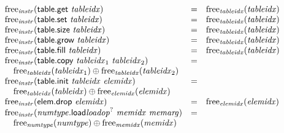 $$\begin{array}[t]{@{}lcl@{}l@{}}
{\mathrm{free}}_{\mathit{instr}}(\mathsf{table{.}get}~{\mathit{tableidx}}) & = & {\mathrm{free}}_{\mathit{tableidx}}({\mathit{tableidx}}) \\
{\mathrm{free}}_{\mathit{instr}}(\mathsf{table{.}set}~{\mathit{tableidx}}) & = & {\mathrm{free}}_{\mathit{tableidx}}({\mathit{tableidx}}) \\
{\mathrm{free}}_{\mathit{instr}}(\mathsf{table{.}size}~{\mathit{tableidx}}) & = & {\mathrm{free}}_{\mathit{tableidx}}({\mathit{tableidx}}) \\
{\mathrm{free}}_{\mathit{instr}}(\mathsf{table{.}grow}~{\mathit{tableidx}}) & = & {\mathrm{free}}_{\mathit{tableidx}}({\mathit{tableidx}}) \\
{\mathrm{free}}_{\mathit{instr}}(\mathsf{table{.}fill}~{\mathit{tableidx}}) & = & {\mathrm{free}}_{\mathit{tableidx}}({\mathit{tableidx}}) \\
{\mathrm{free}}_{\mathit{instr}}(\mathsf{table{.}copy}~{\mathit{tableidx}}_1~{\mathit{tableidx}}_2) & = & & \\
 \multicolumn{4}{@{}l@{}}{\quad
\begin{array}[t]{@{}l@{}}
{\mathrm{free}}_{\mathit{tableidx}}({\mathit{tableidx}}_1) \oplus {\mathrm{free}}_{\mathit{tableidx}}({\mathit{tableidx}}_2) \\
\end{array}
} \\
{\mathrm{free}}_{\mathit{instr}}(\mathsf{table{.}init}~{\mathit{tableidx}}~{\mathit{elemidx}}) & = & & \\
 \multicolumn{4}{@{}l@{}}{\quad
\begin{array}[t]{@{}l@{}}
{\mathrm{free}}_{\mathit{tableidx}}({\mathit{tableidx}}) \oplus {\mathrm{free}}_{\mathit{elemidx}}({\mathit{elemidx}}) \\
\end{array}
} \\
{\mathrm{free}}_{\mathit{instr}}(\mathsf{elem{.}drop}~{\mathit{elemidx}}) & = & {\mathrm{free}}_{\mathit{elemidx}}({\mathit{elemidx}}) \\
{\mathrm{free}}_{\mathit{instr}}({{\mathit{numtype}}{.}\mathsf{load}}{{{\mathit{loadop}}^?}}~{\mathit{memidx}}~{\mathit{memarg}}) & = & & \\
 \multicolumn{4}{@{}l@{}}{\quad
\begin{array}[t]{@{}l@{}}
{\mathrm{free}}_{\mathit{numtype}}({\mathit{numtype}}) \oplus {\mathrm{free}}_{\mathit{memidx}}({\mathit{memidx}}) \\
\end{array}
} \\

\end{array}$$
